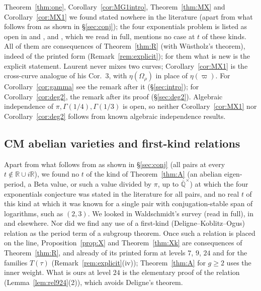 \documentclass[11pt]{amsart}
\theoremstyle{definition}
\newcommand{\Qb}{\overline{\mathbb{Q}}}
\newcommand{\R}{\mathbb{R}}
\newcommand{\vp}{\varpi}
\begin{document}
Theorem~\ref{thm:one}, Corollary~\ref{cor:MG1intro}, Theorem~\ref{thm:MX} and Corollary~\ref{cor:MX1} we found stated
nowhere in the literature (apart from what follows from \cite{W07} as shown in \S\ref{sec:conj}); the four exponentials
problem is listed as open in \cite[p.~27]{SMF84} and \cite{W22}, and \cite{W22}, which we read in full, mentions no case at
$t$ of these kinds. All of them are consequences of Theorem~\ref{thm:R} (with W\"ustholz's
theorem), indeed of the printed form \cite[Th\'eor\`eme (iii)]{RW93} (Remark~\ref{rem:explicit}); for them what is new is
the explicit statement. Laurent \cite{La82} never mixes two
curves; Corollary~\ref{cor:MX1} is the cross-curve analogue of his Cor.~3, with $\eta(\Omega_\rho)$ in place of
$\eta(\vp)$. For Corollary~\ref{cor:gamma} see the remark after it (\S\ref{sec:intro}); for Corollary~\ref{cor:deg2}, the remark
after its proof (\S\ref{sec:deg2}). Algebraic independence of $\pi,\Gamma(1/4),\Gamma(1/3)$ is open, so neither
Corollary~\ref{cor:MX1} nor Corollary~\ref{cor:deg2} follows from known algebraic independence results.

\subsection{CM abelian varieties and first-kind relations}\label{sec:novA}
Apart from what follows from \cite{W07} as shown in \S\ref{sec:conj} (all pairs at every $t\notin\R\cup i\R$), we found no
$t$ of the kind of Theorem~\ref{thm:A} (an abelian eigen-period, a Beta value, or such a value divided by $\pi$, up to
$\Qb^\times$) at which the four exponentials conjecture was stated in the literature for all pairs, and no real $t$ of this
kind at which it was known for a single pair with conjugation-stable span of logarithms, such as $(2,3)$. We looked in
Waldschmidt's survey \cite{W22} (read in full), in \cite{W05,W05b,W07,Wfermat82,Wper05} and elsewhere. Nor did we find any use
of a first-kind (Deligne--Koblitz--Ogus) relation as the period term of a subgroup theorem. Once such a relation is placed
on the line, Proposition~\ref{prop:X} and Theorem~\ref{thm:Xk} are consequences of Theorem~\ref{thm:R}, and already of its
printed form at levels $7$, $9$, $24$ and for the families $T(\tau)$ (Remark~\ref{rem:explicit}(iv)); Theorem~\ref{thm:A}
for $g\ge2$ uses the inner weight. What is ours at level
$24$ is the elementary proof of the relation (Lemma~\ref{lem:rel924}(2)), which avoids Deligne's theorem.
\end{document}
